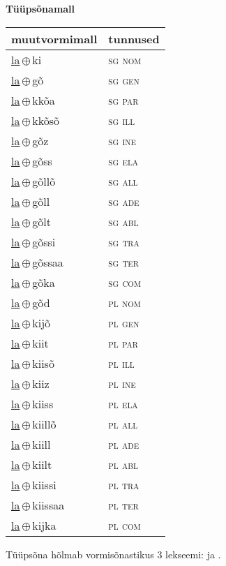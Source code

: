 

\vspace{3.5em}
\noindent \begin{minipage}{\textwidth}
\noindent \textbf{Tüüpsõnamall \,}\\

\begin{sideways}
\begin{tabular}{l l}
muutvormimall & tunnused \\
\hline
\underline{la}\,$\oplus$\,ki & \textsc{ sg nom } \\
\underline{la}\,$\oplus$\,gõ & \textsc{ sg gen } \\
\underline{la}\,$\oplus$\,kkõa & \textsc{ sg par } \\
\underline{la}\,$\oplus$\,kkõsõ & \textsc{ sg ill } \\
\underline{la}\,$\oplus$\,gõz & \textsc{ sg ine } \\
\underline{la}\,$\oplus$\,gõss & \textsc{ sg ela } \\
\underline{la}\,$\oplus$\,gõllõ & \textsc{ sg all } \\
\underline{la}\,$\oplus$\,gõll & \textsc{ sg ade } \\
\underline{la}\,$\oplus$\,gõlt & \textsc{ sg abl } \\
\underline{la}\,$\oplus$\,gõssi & \textsc{ sg tra } \\
\underline{la}\,$\oplus$\,gõssaa & \textsc{ sg ter } \\
\underline{la}\,$\oplus$\,gõka & \textsc{ sg com } \\
\underline{la}\,$\oplus$\,gõd & \textsc{ pl nom } \\
\underline{la}\,$\oplus$\,kijõ & \textsc{ pl gen } \\
\underline{la}\,$\oplus$\,kiit & \textsc{ pl par } \\
\underline{la}\,$\oplus$\,kiisõ & \textsc{ pl ill } \\
\underline{la}\,$\oplus$\,kiiz & \textsc{ pl ine } \\
\underline{la}\,$\oplus$\,kiiss & \textsc{ pl ela } \\
\underline{la}\,$\oplus$\,kiillõ & \textsc{ pl all } \\
\underline{la}\,$\oplus$\,kiill & \textsc{ pl ade } \\
\underline{la}\,$\oplus$\,kiilt & \textsc{ pl abl } \\
\underline{la}\,$\oplus$\,kiissi & \textsc{ pl tra } \\
\underline{la}\,$\oplus$\,kiissaa & \textsc{ pl ter } \\
\underline{la}\,$\oplus$\,kijka & \textsc{ pl com } \\
\end{tabular}
\end{sideways}
\label{tab:tüüpsõnamall-laki}

\end{minipage}

 
\vspace{1em}
\noindent Tüüpsõna hõlmab vormisõnastikus 3 lekseemi:  ja .
